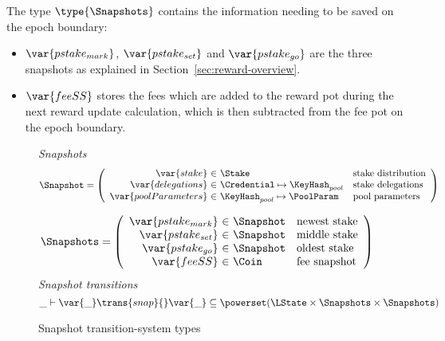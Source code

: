 The type $\type{\Snapshots}$ contains the
information needing to be saved on the epoch boundary:
\begin{itemize}
  \item $\var{pstake_{mark}}$, $\var{pstake_{set}}$ and $\var{pstake_{go}}$ are the three
    snapshots as explained in Section~\ref{sec:reward-overview}.
  \item $\var{feeSS}$ stores the fees which are added to the reward pot during
    the next reward update calculation, which is then subtracted from the fee pot
    on the epoch boundary.
\end{itemize}

\begin{figure}[htb]
  \emph{Snapshots}
  \begin{equation*}
    \Snapshot =
    \left(
      \begin{array}{r@{~\in~}ll}
        \var{stake} & \Stake & \text{stake distribution}\\
        \var{delegations} & \Credential\mapsto\KeyHash_{pool}
                          & \text{stake delegations}\\
        \var{poolParameters} & \KeyHash_{pool} \mapsto \PoolParam & \text{pool parameters }\\
      \end{array}
    \right)
  \end{equation*}

  \begin{equation*}
    \Snapshots =
    \left(
      \begin{array}{r@{~\in~}ll}
        \var{pstake_{mark}} & \Snapshot & \text{newest stake}\\
        \var{pstake_{set}}  & \Snapshot & \text{middle stake}\\
        \var{pstake_{go}}   & \Snapshot & \text{oldest stake}\\
        \var{feeSS} & \Coin & \text{fee snapshot}\\
      \end{array}
    \right)
  \end{equation*}
  \emph{Snapshot transitions}
  \begin{equation*}
    \_ \vdash
    \var{\_} \trans{snap}{} \var{\_}
    \subseteq \powerset (\LState \times \Snapshots \times \Snapshots)
  \end{equation*}
  \caption{Snapshot transition-system types}
  \label{fig:ts-types:snapshot}
\end{figure}

